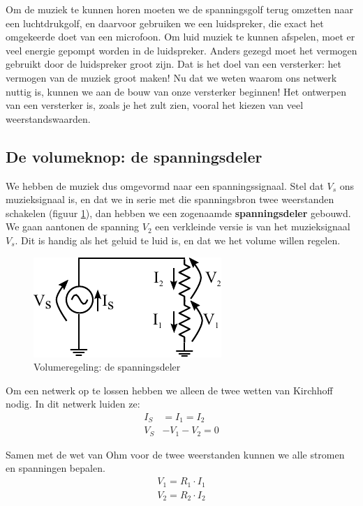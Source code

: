 \documentclass{article}
\begin{document}
			Om de muziek te kunnen horen moeten we de spanningsgolf terug omzetten naar een luchtdrukgolf, en daarvoor gebruiken we een luidspreker, die exact het omgekeerde doet van een microfoon. Om luid muziek te kunnen afspelen, moet er veel energie gepompt worden in de luidspreker. Anders gezegd moet het vermogen gebruikt door de luidspreker groot zijn. Dat is het  doel van een versterker: het vermogen van de muziek groot maken! Nu dat we weten waarom ons netwerk nuttig is, kunnen we aan de bouw van onze versterker beginnen! Het ontwerpen van een versterker is, zoals je het zult zien, vooral het kiezen van veel weerstandswaarden.

		\subsection{De volumeknop: de spanningsdeler}

			We hebben de muziek dus omgevormd naar een spanningssignaal. Stel dat $V_s$ ons muzieksignaal is, en dat we in serie met die spanningsbron twee weerstanden schakelen (figuur \ref{fig:volume}), dan hebben we een zogenaamde \textbf{spanningsdeler} gebouwd. We gaan aantonen de spanning $V_2$ een verkleinde versie is van het muzieksignaal $V_s$. Dit is handig als het geluid te luid is, en dat we het volume willen regelen.

			\begin{figure}[htbp]
				\centering
				\includegraphics{weerstandsdeler}
				\caption{Volumeregeling: de spanningsdeler}
				\label{fig:volume}
			\end{figure}

			Om een netwerk op te lossen hebben we alleen de twee wetten van Kirchhoff nodig. In dit netwerk luiden ze:
			\begin{align}
			    I_S &= I_1 = I_2 \\
			    V_S &- V_1 -V_2 = 0 
			\end{align}

			Samen met de wet van Ohm voor de twee weerstanden kunnen we alle stromen en spanningen bepalen.
			\begin{align}
			    V_1 = R_1 \cdot I_1 \\
			    V_2 = R_2 \cdot I_2
			\end{align}
\end{document}
